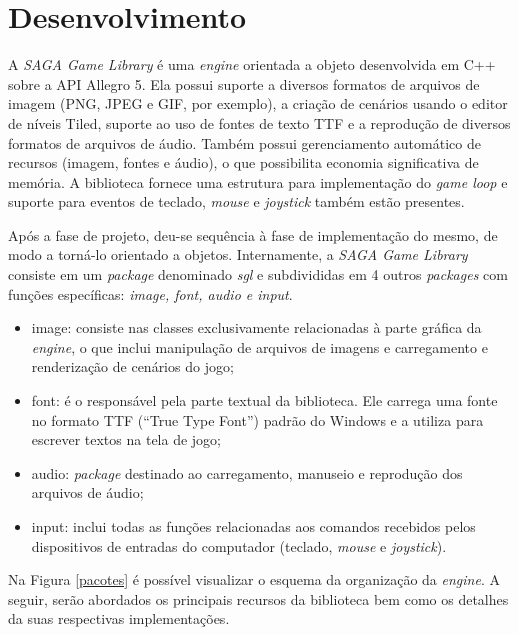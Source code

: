 \chapter{Desenvolvimento}
\label{cap:desenvolvimento}
%
%
%
A \textit{SAGA Game Library} é uma \textit{engine} orientada a objeto desenvolvida em C++ sobre a API Allegro 5. Ela possui suporte a diversos formatos de arquivos de imagem (PNG, JPEG e GIF, por exemplo), a criação de cenários usando o editor de níveis Tiled, suporte ao uso de fontes de texto TTF e a reprodução de diversos formatos de arquivos de áudio. Também possui gerenciamento automático de recursos (imagem, fontes e áudio), o que possibilita economia significativa de memória. A biblioteca fornece uma estrutura para implementação do \textit{game loop} e suporte para eventos de teclado, \textit{mouse} e \textit{joystick} também estão presentes. 
\par 
Após a fase de projeto, deu-se sequência à fase de implementação do mesmo, de modo a torná-lo orientado a objetos. Internamente, a \textit{SAGA Game Library} consiste em um \textit{package} denominado \textit{sgl} e subdivididas em 4 outros \textit{packages} com funções específicas: \textit{image, font, audio e input}.
%
%
\begin{itemize}
 \item image: consiste nas classes exclusivamente relacionadas à parte gráfica da \textit{engine}, o que inclui manipulação de arquivos de imagens e carregamento e renderização de cenários do jogo;
 \item font: é o responsável pela parte textual da biblioteca. Ele carrega uma fonte no formato TTF (``True Type Font'') padrão do Windows e a utiliza para escrever textos na tela de jogo;
 \item audio: \textit{package} destinado ao carregamento, manuseio e reprodução dos arquivos de áudio;
 \item input: inclui todas as funções relacionadas aos comandos recebidos pelos dispositivos de entradas do computador (teclado, \textit{mouse} e \textit{joystick}).
\end{itemize}
%
\par
Na Figura \ref{pacotes} é possível visualizar o esquema da organização da \textit{engine}. A seguir, serão abordados os principais recursos da biblioteca bem como os detalhes da suas respectivas implementações.
